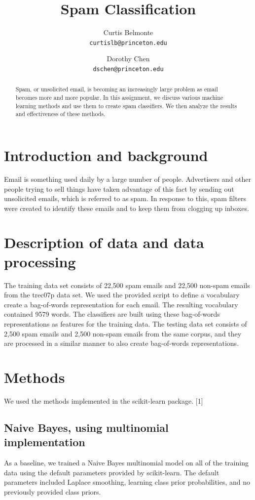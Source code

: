 \documentclass{article} %
\title{Spam Classification}
\author{Curtis Belmonte\\
{\tt\small curtislb@princeton.edu}
\and
Dorothy Chen\\
{\tt\small dschen@princeton.edu}
}
\begin{document}
\maketitle

\begin{abstract}
Spam, or unsolicited email, is becoming an increasingly large problem as email becomes more and more popular. In this assignment, we discuss various machine learning methods and use them to create spam classifiers. We then analyze the results and effectiveness of these methods. 
\end{abstract}

\section{Introduction and background}
Email is something used daily by a large number of people. Advertisers and other people trying to sell things have taken advantage of this fact by sending out unsolicited emails, which is referred to as spam. In response to this, spam filters were created to identify these emails and to keep them from clogging up inboxes.

\section{Description of data and data processing}
The training data set consists of 22,500 spam emails and 22,500 non-spam emails from the trec07p data set. We used the provided script to define a vocabulary create a bag-of-words representation for each email. The resulting vocabulary contained 9579 words. The classifiers are built using these bag-of-words representations as features for the training data. The testing data set consists of 2,500 spam emails and 2,500 non-spam emails from the same corpus, and they are processed in a similar manner to also create bag-of-words representations. 

\section{Methods}
We used the methods implemented in the scikit-learn package. [1]
\subsection{Naive Bayes, using multinomial implementation}
As a baseline, we trained a Naive Bayes multinomial model on all of the training data using the default parameters provided by scikit-learn. The default parameters included Laplace smoothing, learning class prior probabilities, and no previously provided class priors. 
\end{document}
